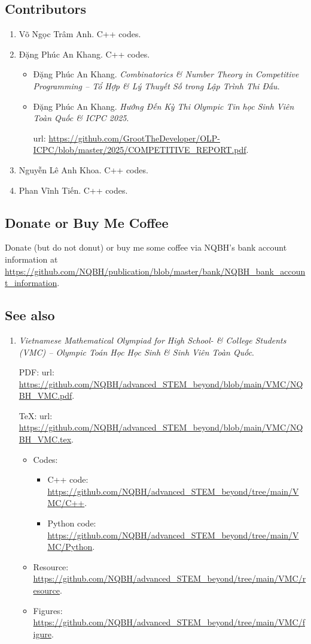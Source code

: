 \documentclass{article}
\begin{document}
\subsection{Contributors}

\begin{enumerate}
	\item {\sc Võ Ngọc Trâm Anh}. C++ codes.
	\item {\sc Đặng Phúc An Khang}. C++ codes.
	\begin{itemize}
		\item {\sc Đặng Phúc An Khang}. {\it Combinatorics \& Number Theory in Competitive Programming -- Tổ Hợp \& Lý Thuyết Số trong Lập Trình Thi Đấu}.
		\item {\sc Đặng Phúc An Khang}. {\it Hướng Đến Kỳ Thi Olympic Tin học Sinh Viên Toàn Quốc \& ICPC 2025}.
		
		{\sc url}: \url{https://github.com/GrootTheDeveloper/OLP-ICPC/blob/master/2025/COMPETITIVE_REPORT.pdf}.
	\end{itemize}
	\item {\sc Nguyễn Lê Anh Khoa}. C++ codes.
	\item {\sc Phan Vĩnh Tiến}. C++ codes.
\end{enumerate}

\subsection{Donate or Buy Me Coffee}
Donate (but do not donut) or buy me some coffee via NQBH's bank account information at \url{https://github.com/NQBH/publication/blob/master/bank/NQBH_bank_account_information}.

\subsection{See also}

\begin{enumerate}
	\item {\it Vietnamese Mathematical Olympiad for High School- \& College Students (VMC) -- Olympic Toán Học Học Sinh \& Sinh Viên Toàn Quốc}.
	
	PDF: {\sc url}: \url{https://github.com/NQBH/advanced_STEM_beyond/blob/main/VMC/NQBH_VMC.pdf}.
	
	\TeX: {\sc url}: \url{https://github.com/NQBH/advanced_STEM_beyond/blob/main/VMC/NQBH_VMC.tex}.
	\begin{itemize}
		\item Codes:
		\begin{itemize}
			\item C++ code: \url{https://github.com/NQBH/advanced_STEM_beyond/tree/main/VMC/C++}.
			\item Python code: \url{https://github.com/NQBH/advanced_STEM_beyond/tree/main/VMC/Python}.
		\end{itemize}
		\item Resource: \url{https://github.com/NQBH/advanced_STEM_beyond/tree/main/VMC/resource}.
		\item Figures: \url{https://github.com/NQBH/advanced_STEM_beyond/tree/main/VMC/figure}.
	\end{itemize}
\end{enumerate}


\printbibliography[heading=bibintoc]
	
\end{document}
